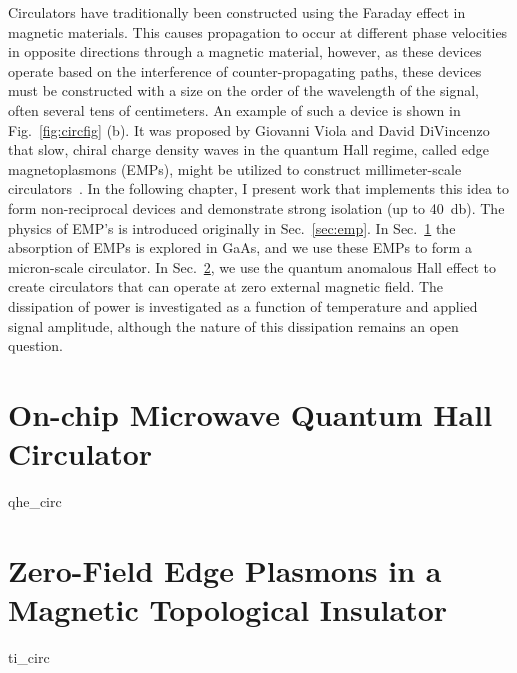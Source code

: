 Circulators have traditionally been constructed using the Faraday effect in magnetic materials. This causes propagation to occur at different phase
velocities in opposite directions through a magnetic material, however, as these devices operate based on the interference of counter-propagating paths,
these devices must be constructed with a size on the order of the wavelength of the signal, often several tens of centimeters. An example of such a device is
shown in Fig.~\ref{fig:circfig} (b). It was proposed by
Giovanni Viola and David DiVincenzo that slow, chiral charge density waves in the quantum Hall regime, called edge magnetoplasmons (EMPs), might be utilized to
construct millimeter-scale circulators~\cite{PhysRevX.4.021019}. In the following chapter, I present work that implements this idea to form non-reciprocal
devices and demonstrate strong isolation (up to \SI{40}{\decibel}). The physics of EMP's is introduced originally in Sec.~\ref{sec:emp}. In Sec.~\ref{sec:hallcirc} the
absorption of EMPs is explored in GaAs, and we use these EMPs to form a micron-scale circulator. In Sec.~\ref{sec:spinhallcirc}, we use the quantum anomalous Hall
effect to create circulators that can operate at zero external magnetic field. The dissipation of power is investigated as a function of temperature and applied signal
amplitude, although the nature of this dissipation remains an open question.

\clearpage
\section{On-chip Microwave Quantum Hall Circulator}
\label{sec:hallcirc}
{qhe_circ}

\clearpage
\section{Zero-Field Edge Plasmons in a Magnetic Topological Insulator}
\label{sec:spinhallcirc}
{ti_circ}
